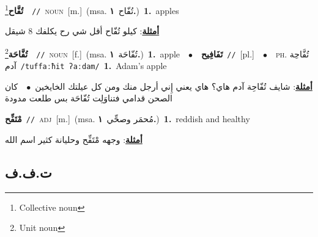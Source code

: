 \documentclass[10pt,a4paper,twoside]{article} %
\begin{document}
\begin{multicols}{2}
{\setlength\topsep{0pt}\textbf{\foreignlanguage{arabic}{تُفَّاح}}\footnote{Collective noun}\ \ {\color{gray}\texttt{//}\color{black}}\ \textsc{noun}\ [m.]\ \color{gray}(msa. \foreignlanguage{arabic}{تُفّاح}~\foreignlanguage{arabic}{\textbf{١.}})\color{black}\ \textbf{1.}~apples\  \begin{flushright}\color{gray}\foreignlanguage{arabic}{\textbf{\underline{\foreignlanguage{arabic}{أمثلة}}}: كيلو تُفّاح أقل شي رح يكلفك 8 شيقل}\end{flushright}\color{black}} \vspace{2mm}

{\setlength\topsep{0pt}\textbf{\foreignlanguage{arabic}{تُفَّاحَة}}\footnote{Unit noun}\ \ {\color{gray}\texttt{//}\color{black}}\ \textsc{noun}\ [f.]\ \color{gray}(msa. \foreignlanguage{arabic}{تُفّاحَة}~\foreignlanguage{arabic}{\textbf{١.}})\color{black}\ \textbf{1.}~apple\ \ $\bullet$\ \ \setlength\topsep{0pt}\textbf{\foreignlanguage{arabic}{تَفَافِيح}}\ {\color{gray}\texttt{//}\color{black}}\ [pl.]\ \ $\bullet$\ \ \textsc{ph.} \color{gray} \foreignlanguage{arabic}{تُفَّاحِة آدم}\color{black}\ {\color{gray}\texttt{/{\sffamily tuffaːħit ʔaːdam}/}\color{black}}\ \textbf{1.}~Adam's apple\  \begin{flushright}\color{gray}\foreignlanguage{arabic}{\textbf{\underline{\foreignlanguage{arabic}{أمثلة}}}: شايف تُفّاحِة آدم هاي؟ هاي يعني إِني أرجل منك ومن كل عيلتك الخايخين\ $\bullet$\ \  كان الصحن قدامي فتناوَلِت تُفّاحَة بس طلعت مدودة}\end{flushright}\color{black}} \vspace{2mm}

{\setlength\topsep{0pt}\textbf{\foreignlanguage{arabic}{مْتَفِّح}}\ {\color{gray}\texttt{//}\color{black}}\ \textsc{adj}\ [m.]\ \color{gray}(msa. \foreignlanguage{arabic}{مُحمَر وصحِّي}~\foreignlanguage{arabic}{\textbf{١.}})\color{black}\ \textbf{1.}~reddish and healthy\  \begin{flushright}\color{gray}\foreignlanguage{arabic}{\textbf{\underline{\foreignlanguage{arabic}{أمثلة}}}: وجهه مْتَفِّح وحليانة كثير اسم الله}\end{flushright}\color{black}} \vspace{2mm}

\vspace{-3mm}
\subsection*{\color{blue}\foreignlanguage{arabic}{ت.ف.ف}\color{blue}{}} 


\end{multicols}
\end{document}

